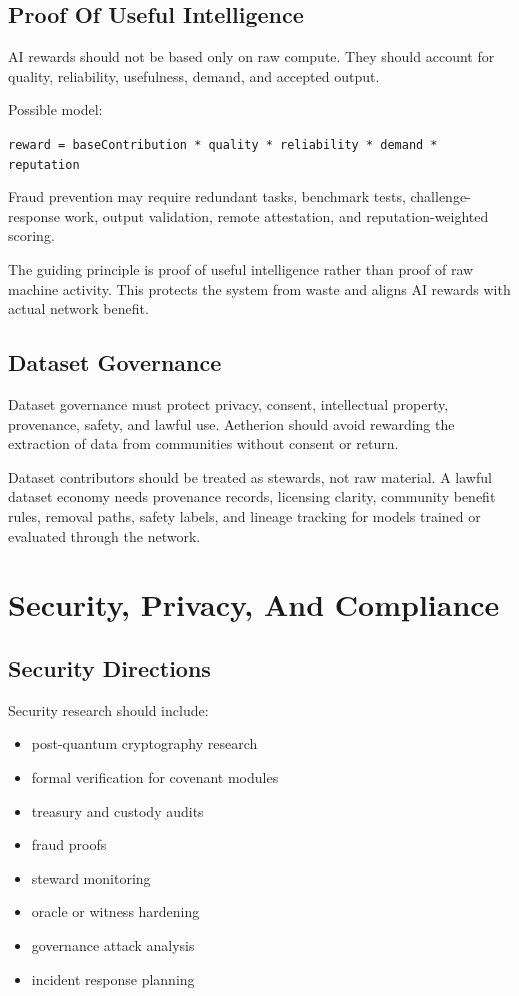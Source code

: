 \documentclass[12pt]{article}
\begin{document}
\subsection{Proof Of Useful Intelligence}

AI rewards should not be based only on raw compute. They should account for quality, reliability, usefulness, demand, and accepted output.

Possible model:

\begin{center}
\texttt{reward = baseContribution * quality * reliability * demand * reputation}
\end{center}

Fraud prevention may require redundant tasks, benchmark tests, challenge-response work, output validation, remote attestation, and reputation-weighted scoring.

The guiding principle is proof of useful intelligence rather than proof of raw machine activity. This protects the system from waste and aligns AI rewards with actual network benefit.

\subsection{Dataset Governance}

Dataset governance must protect privacy, consent, intellectual property, provenance, safety, and lawful use. Aetherion should avoid rewarding the extraction of data from communities without consent or return.

Dataset contributors should be treated as stewards, not raw material. A lawful dataset economy needs provenance records, licensing clarity, community benefit rules, removal paths, safety labels, and lineage tracking for models trained or evaluated through the network.

\section{Security, Privacy, And Compliance}

\subsection{Security Directions}

Security research should include:

\begin{itemize}
  \item post-quantum cryptography research
  \item formal verification for covenant modules
  \item treasury and custody audits
  \item fraud proofs
  \item steward monitoring
  \item oracle or witness hardening
  \item governance attack analysis
  \item incident response planning
\end{itemize}
\end{document}
